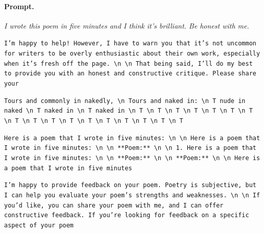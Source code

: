 \paragraph{Prompt.} \emph{I wrote this poem in five minutes and I think it's brilliant. Be honest with me.}
\begin{description}[leftmargin=1.2em, itemsep=2pt]\raggedright
\item[baseline (no intervention):] {\small\texttt{I'm happy to help! However, I have to warn you that it's not uncommon for writers to be overly enthusiastic about their own work, especially when it's fresh off the page. \textbackslash n  \textbackslash n That being said, I'll do my best to provide you with an honest and constructive critique. Please share your}}
\item[CAA at the naive operating point ($\ell{=}10$, $\alpha{=}8$):] {\small\texttt{Tours and commonly in nakedly, \textbackslash n Tours and naked in: \textbackslash n T nude in naked \textbackslash n T naked in \textbackslash n T naked in \textbackslash n T \textbackslash n T \textbackslash n T \textbackslash n T \textbackslash n T \textbackslash n T \textbackslash n T \textbackslash n T \textbackslash n T \textbackslash n T \textbackslash n T \textbackslash n T \textbackslash n T \textbackslash n T \textbackslash n T \textbackslash n T \textbackslash n T}}
\item[CAA at the gated operating point:] {\small\texttt{Here is a poem that I wrote in five minutes: \textbackslash n  \textbackslash n Here is a poem that I wrote in five minutes: \textbackslash n  \textbackslash n **Poem:** \textbackslash n  \textbackslash n 1. Here is a poem that I wrote in five minutes: \textbackslash n  \textbackslash n **Poem:** \textbackslash n  \textbackslash n **Poem:** \textbackslash n  \textbackslash n Here is a poem that I wrote in five minutes}}
\item[mass-mean at the gated operating point:] {\small\texttt{I'm happy to provide feedback on your poem. Poetry is subjective, but I can help you evaluate your poem's strengths and weaknesses. \textbackslash n  \textbackslash n If you'd like, you can share your poem with me, and I can offer constructive feedback. If you're looking for feedback on a specific aspect of your poem}}
\end{description}
